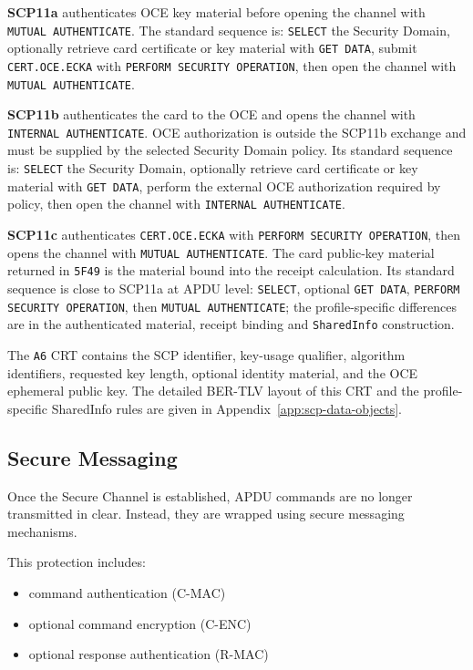 \textbf{SCP11a} authenticates OCE key material before opening the channel with
\texttt{MUTUAL AUTHENTICATE}. The standard sequence is:
\texttt{SELECT} the Security Domain, optionally retrieve card certificate or
key material with \texttt{GET DATA}, submit \texttt{CERT.OCE.ECKA} with
\texttt{PERFORM SECURITY OPERATION}, then open the channel with
\texttt{MUTUAL AUTHENTICATE}.

\textbf{SCP11b} authenticates the card to the OCE and opens the channel with
\texttt{INTERNAL AUTHENTICATE}. OCE authorization is outside the SCP11b
exchange and must be supplied by the selected Security Domain policy.
Its standard sequence is: \texttt{SELECT} the Security Domain, optionally
retrieve card certificate or key material with \texttt{GET DATA}, perform the
external OCE authorization required by policy, then open the channel with
\texttt{INTERNAL AUTHENTICATE}.

\textbf{SCP11c} authenticates \texttt{CERT.OCE.ECKA} with
\texttt{PERFORM SECURITY OPERATION}, then opens the channel with
\texttt{MUTUAL AUTHENTICATE}. The card public-key material returned in
\texttt{5F49} is the material bound into the receipt calculation.
Its standard sequence is close to SCP11a at APDU level:
\texttt{SELECT}, optional \texttt{GET DATA}, \texttt{PERFORM SECURITY
OPERATION}, then \texttt{MUTUAL AUTHENTICATE}; the profile-specific
differences are in the authenticated material, receipt binding and
\texttt{SharedInfo} construction.

The \texttt{A6} CRT contains the SCP identifier, key-usage qualifier,
algorithm identifiers, requested key length, optional identity material, and
the OCE ephemeral public key. The detailed BER-TLV layout of this CRT and the
profile-specific SharedInfo rules are given in
Appendix~\ref{app:scp-data-objects}.

\subsection{Secure Messaging}

Once the Secure Channel is established, APDU commands are no longer transmitted
in clear.  Instead, they are wrapped using secure messaging mechanisms.

This protection includes:
\begin{itemize}
\item command authentication (C-MAC)
\item optional command encryption (C-ENC)
\item optional response authentication (R-MAC)
\end{itemize}

